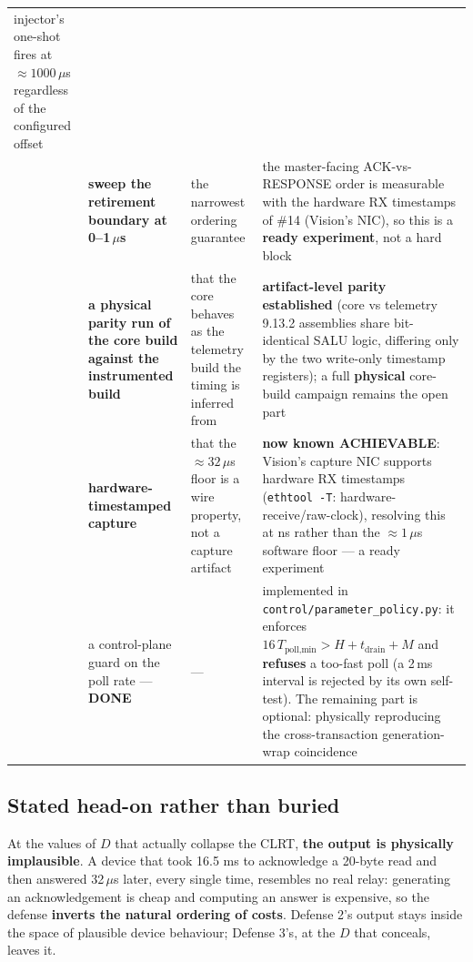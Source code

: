 \documentclass[10pt,a4paper,oneside]{article}
\newcommand{\num}[1]{\mbox{#1}}
\newcommand{\code}[1]{\texttt{\small #1}}
\begin{document}
{\begin{longtable}{@{}>{\raggedright\arraybackslash}p{}>{\raggedright\arraybackslash}p{}>{\raggedright\arraybackslash}p{}>{\raggedright\arraybackslash}p{}@{}}
    injector's one-shot fires at ${\approx}1000\,\mu$s regardless of the configured offset \\
12 & \textbf{sweep the retirement boundary at 0--1\,$\mu$s}
  & the narrowest ordering guarantee
  & the master-facing ACK-vs-RESPONSE order is measurable with the hardware RX timestamps of \#14 (Vision's NIC), so this is a \textbf{ready experiment}, not a hard block \\
13 & \textbf{a physical parity run of the core build against the instrumented build}
  & that the core behaves as the telemetry build the timing is inferred from
  & \textbf{artifact-level parity established} (core vs telemetry 9.13.2 assemblies share bit-identical SALU logic, differing only by the two write-only timestamp registers); a full \textbf{physical} core-build campaign remains the open part \\
14 & \textbf{hardware-timestamped capture}
  & that the ${\approx}32\,\mu$s floor is a wire property, not a capture artifact
  & \textbf{now known ACHIEVABLE}: Vision's capture NIC supports hardware RX timestamps (\code{ethtool -T}: hardware-receive/raw-clock), resolving this at ns rather than the ${\approx}1\,\mu$s software floor --- a ready experiment \\
15 & a control-plane guard on the poll rate --- \textbf{DONE}
  & ---
  & implemented in \code{control/parameter\_policy.py}: it enforces
    $16\,T_{\text{poll,min}} > H + t_{\text{drain}} + M$ and \textbf{refuses} a too-fast poll
    (a 2\,ms interval is rejected by its own self-test). The remaining part is optional:
    physically reproducing the cross-transaction generation-wrap coincidence \\
\bottomrule
\end{longtable}}

\subsection{Stated head-on rather than buried}

At the values of $D$ that actually collapse the CLRT, \textbf{the output is physically
implausible}. A
device that took \num{16.5} ms to acknowledge a 20-byte read and then answered
\num{32}\,$\mu$s later, every single time, resembles no real relay: generating an
acknowledgement is cheap and computing an answer is expensive, so the defense
\textbf{inverts the natural ordering of costs}. Defense 2's output stays inside the space of
plausible device behaviour; Defense 3's, at the $D$ that conceals, leaves it.
\end{document}
